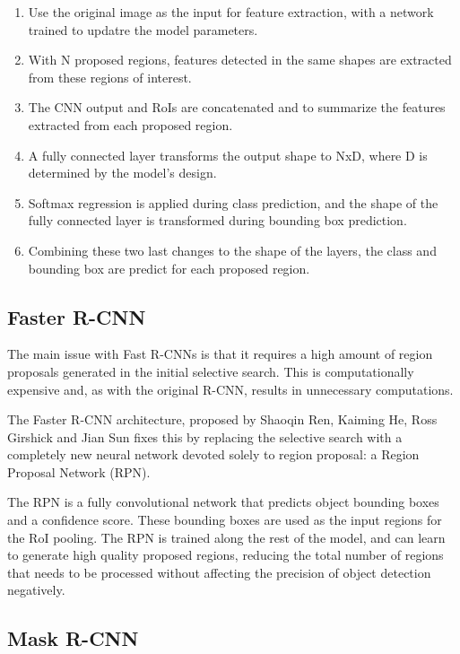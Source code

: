 \documentclass[10pt,a4paper,twocolumn,twoside]{article}
\begin{document}
\begin{enumerate}
    \item Use the original image as the input for feature extraction, with a network trained to updatre the model parameters.
    \item With N proposed regions, features detected in the same shapes are extracted from these regions of interest. 
    \item The CNN output and RoIs are concatenated and to summarize the features extracted from each proposed region.
    \item A fully connected layer transforms the output shape to NxD, where D is determined by the model's design.
    \item Softmax regression is applied during class prediction, and the shape of the fully connected layer is transformed during bounding box prediction.
    \item Combining these two last changes to the shape of the layers, the class and bounding box are predict for each proposed region.
\end{enumerate}

\subsection{Faster R-CNN}

The main issue with Fast R-CNNs is that it requires a high amount of region proposals generated in the initial selective search. This is computationally expensive and, as with the original R-CNN, results in unnecessary computations. 

The Faster R-CNN architecture, proposed by Shaoqin Ren, Kaiming He, Ross Girshick and Jian Sun\cite{ren_he_girshick_sun_2015} fixes this by replacing the selective search with a completely new neural network devoted solely to region proposal: a Region Proposal Network (RPN). 

The RPN is a fully convolutional network that predicts object bounding boxes and a confidence score. These bounding boxes are used as the input regions for the RoI pooling. The RPN is trained along the rest of the model, and can learn to generate high quality proposed regions, reducing the total number of regions that needs to be processed without affecting the precision of object detection negatively. 

\subsection{Mask R-CNN}
\end{document}
